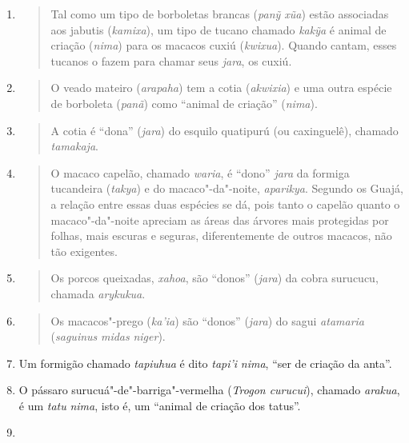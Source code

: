 \begin{enumerate}
\def\labelenumi{\arabic{enumi}.}
\item
  \begin{quote}
  Tal como um tipo de borboletas brancas (\emph{panỹ xũa}) estão
  associadas aos jabutis (\emph{kamixa}), um tipo de tucano chamado
  \emph{kakỹa} é animal de criação (\emph{nima}) para os macacos cuxiú
  (\emph{kwixua}). Quando cantam, esses tucanos o fazem para chamar seus
  \emph{jara}, os cuxiú.
  \end{quote}
\item
  \begin{quote}
  O veado mateiro (\emph{arapaha}) tem a cotia (\emph{akwixia}) e uma
  outra espécie de borboleta (\emph{panã}) como ``animal de criação''
  (\emph{nima}).
  \end{quote}
\item
  \begin{quote}
  A cotia é ``dona'' (\emph{jara}) do esquilo quatipurú (ou caxinguelê),
  chamado \emph{tamakaja}.
  \end{quote}
\item
  \begin{quote}
  O macaco capelão, chamado \emph{waria}, é ``dono'' \emph{jara} da
  formiga tucandeira (\emph{takya}) e do macaco"-da"-noite,
  \emph{aparikya}. Segundo os Guajá, a relação entre essas duas espécies
  se dá, pois tanto o capelão quanto o macaco"-da"-noite apreciam as áreas
  das árvores mais protegidas por folhas, mais escuras e seguras,
  diferentemente de outros macacos, não tão exigentes.
  \end{quote}
\item
  \begin{quote}
  Os porcos queixadas, \emph{xahoa}, são ``donos'' (\emph{jara}) da
  cobra surucucu, chamada \emph{arykukua}.
  \end{quote}
\item
  \begin{quote}
  Os macacos"-prego (\emph{ka'ia}) são ``donos'' (\emph{jara}) do sagui
  \emph{atamaria} (\emph{saguinus} \emph{midas} \emph{niger}).
  \end{quote}
\item
  Um formigão chamado \emph{tapiuhua} é dito \emph{tapi'i} \emph{nima},
  ``ser de criação da anta''.
\item
  O pássaro surucuá"-de"-barriga"-vermelha (\emph{Trogon curucui}), chamado
  \emph{arakua}, é um \emph{tatu} \emph{nima}, isto é, um ``animal de
  criação dos tatus''.
\item

\end{enumerate}
